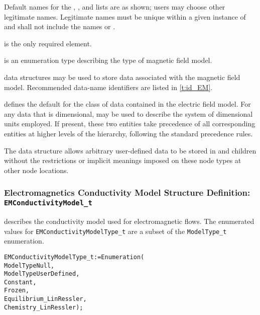 \begin{notes}
\item Default names for the , , and
      lists are as shown; users may choose other legitimate names.
      Legitimate names must be unique within a given instance of
       and shall not include the names
       or .
\item {} is the only required element.
\end{notes}

 is an enumeration type describing
the type of magnetic field model.

 data structures may be used to store data associated
with the magnetic field model.
Recommended data-name identifiers are listed in \autoref{t:id_EM}.

 defines the default for the class of data contained in
the electric field model.
For any data that is dimensional,  may be used to
describe the system of dimensional units employed.
If present, these two entities take precedence of all corresponding
entities at higher levels of the hierarchy, following the standard
precedence rules.

The  data structure allows arbitrary
user-defined data to be stored in  and
 children without the restrictions or implicit
meanings imposed on these node types at other node locations.

\subsubsection{Electromagnetics Conductivity Model Structure Definition: \texttt{EMConductivityModel\_t}}

 describes the conductivity model used
for electromagnetic flows.
The enumerated values for \texttt{EMConductivityModelType\_t} are a subset of the
\texttt{ModelType\_t} enumeration.
\begin{alltt}
  EMConductivityModelType\_t := Enumeration(
    ModelTypeNull,
    ModelTypeUserDefined,
    Constant,
    Frozen,
    Equilibrium\_LinRessler,
    Chemistry\_LinRessler ) ;
\end{alltt}

